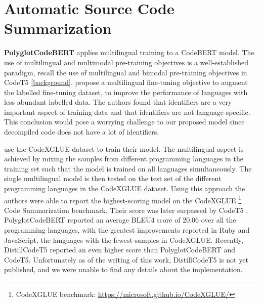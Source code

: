 \section{Automatic Source Code Summarization}
\textbf{PolyglotCodeBERT} \cite{PolyglotCodeBERT} applies multilingual training to a CodeBERT \cite{CodeBERT} model. The use of multilingual and multimodal pre-training objectives is a  well-established paradigm, recall the use of multilingual and bimodal pre-training objectives in CodeT5 \cite{CodeT5} \ref{background}. \citeauthor{PolyglotCodeBERT} propose a multilingual fine-tuning objective to augment the labelled fine-tuning dataset, to improve the performance of languages with less abundant labelled data. The authors found that identifiers are a very important aspect of training data and that identifiers are not language-specific. This conclusion would pose a worrying challenge to our proposed model since decompiled code does not have a lot of identifiers. 

\citeauthor{PolyglotCodeBERT} use the CodeXGLUE dataset to train their model. The multilingual aspect is achieved by mixing the samples from different programming languages in the training set such that the model is trained on all languages simultaneously. The single multilingual model is then tested on the test set of the different programming languages in the CodeXGLUE dataset. Using this approach the authors were able to report the highest-scoring model on the CodeXGLUE \cite{CodeXGlue} \footnote{CodeXGLUE benchmark: \url{https://microsoft.github.io/CodeXGLUE/}} Code Summarization benchmark. Their score was later surpassed by CodeT5 \cite{CodeT5}. PolyglotCodeBERT reported an average BLEU4 score of 20.06 over all the programming languages, with the greatest improvements reported in Ruby and JavaScript, the languages with the fewest samples in CodeXGLUE. Recently, DistillCodeT5 reported an even higher score than PolyglotCodeBERT and CodeT5. Unfortunately as of the writing of this work, DistillCodeT5 is not yet published, and we were unable to find any details about the implementation.

